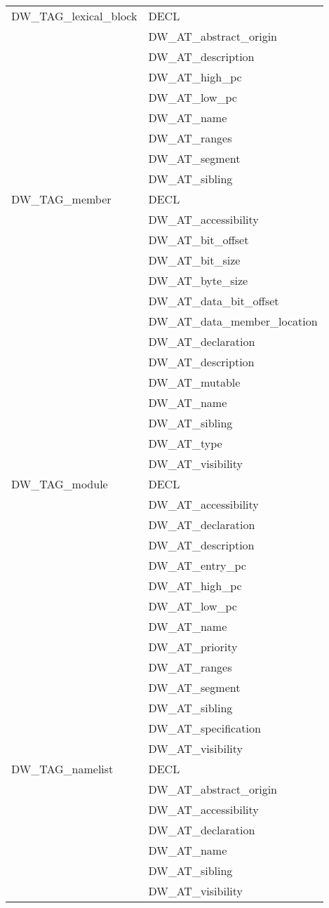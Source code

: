 \begin{longtable}{l|p{8cm}}
DW\_TAG\_lexical\_block
&DECL \\
&DW\_AT\_abstract\_origin \\
&DW\_AT\_description \\
&DW\_AT\_high\_pc \\
&DW\_AT\_low\_pc \\
&DW\_AT\_name \\
&DW\_AT\_ranges \\
&DW\_AT\_segment \\
&DW\_AT\_sibling \\

DW\_TAG\_member
&DECL \\
&DW\_AT\_accessibility \\
&DW\_AT\_bit\_offset \\
&DW\_AT\_bit\_size \\
&DW\_AT\_byte\_size \\
&DW\_AT\_data\_bit\_offset \\
&DW\_AT\_data\_member\_location \\
&DW\_AT\_declaration \\
&DW\_AT\_description \\
&DW\_AT\_mutable \\
&DW\_AT\_name \\
&DW\_AT\_sibling \\
&DW\_AT\_type \\
&DW\_AT\_visibility \\


DW\_TAG\_module
&DECL \\
&DW\_AT\_accessibility \\
&DW\_AT\_declaration \\
&DW\_AT\_description \\
&DW\_AT\_entry\_pc \\
&DW\_AT\_high\_pc \\
&DW\_AT\_low\_pc \\
&DW\_AT\_name \\
&DW\_AT\_priority \\
&DW\_AT\_ranges \\
&DW\_AT\_segment \\
&DW\_AT\_sibling \\
&DW\_AT\_specification \\
&DW\_AT\_visibility \\

DW\_TAG\_namelist
&DECL \\
&DW\_AT\_abstract\_origin \\
&DW\_AT\_accessibility \\
&DW\_AT\_declaration \\
&DW\_AT\_name \\
&DW\_AT\_sibling \\
&DW\_AT\_visibility \\


\end{longtable}
